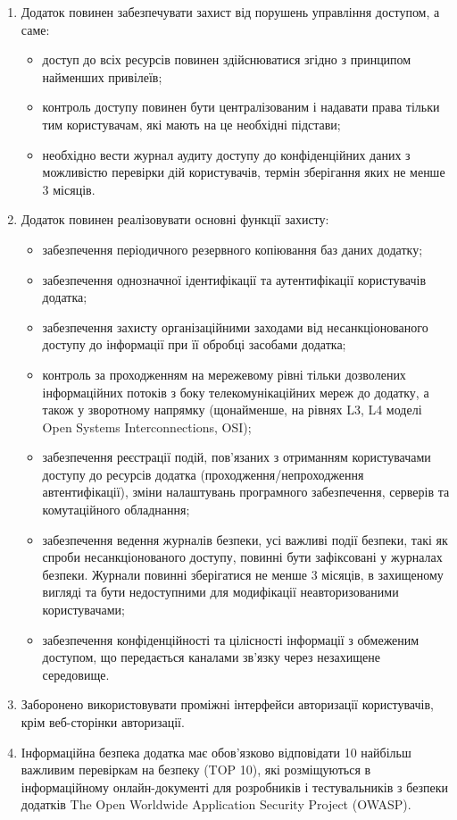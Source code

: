 \documentclass{article}
\begin{document}
\begin{enumerate}
  \item Додаток повинен забезпечувати захист від порушень управління доступом, а саме:
    \begin{itemize}
      \item доступ до всіх ресурсів повинен здійснюватися згідно з принципом найменших привілеїв;
      \item контроль доступу повинен бути централізованим і надавати права тільки тим користувачам, які мають на це необхідні підстави;
      \item необхідно вести журнал аудиту доступу до конфіденційних даних з можливістю перевірки дій користувачів, термін зберігання яких не менше 3 місяців.
    \end{itemize}

  \item Додаток повинен реалізовувати основні функції захисту:
    \begin{itemize}
      \item забезпечення періодичного резервного копіювання баз даних додатку;
      \item забезпечення однозначної ідентифікації та аутентифікації користувачів додатка;
      \item забезпечення захисту організаційними заходами від несанкціонованого доступу до інформації при її обробці засобами додатка;
      \item контроль за проходженням на мережевому рівні тільки дозволених інформаційних потоків з боку телекомунікаційних мереж до додатку, а також у зворотному напрямку (щонайменше, на рівнях L3, L4 моделі Open Systems Interconnections, OSI);
      \item забезпечення реєстрації подій, пов’язаних з отриманням користувачами доступу до ресурсів додатка (проходження/непроходження автентифікації), зміни налаштувань програмного забезпечення, серверів та комутаційного обладнання;
      \item забезпечення ведення журналів безпеки, усі важливі події безпеки, такі як спроби несанкціонованого доступу, повинні бути зафіксовані у журналах безпеки. Журнали повинні зберігатися не менше 3 місяців, в захищеному вигляді та бути недоступними для модифікації неавторизованими користувачами;
      \item забезпечення конфіденційності та цілісності інформації з обмеженим доступом, що передається каналами зв’язку через незахищене середовище.
    \end{itemize}

  \item Заборонено використовувати проміжні інтерфейси авторизації користувачів, крім веб-сторінки авторизації.

  \item Інформаційна безпека додатка має обов’язково відповідати 10 найбільш важливим перевіркам на безпеку (TOP 10),
        які розміщуються в інформаційному онлайн-документі для розробників і тестувальників з безпеки додатків The
        Open Worldwide Application Security Project (OWASP).
\end{enumerate}
\end{document}
